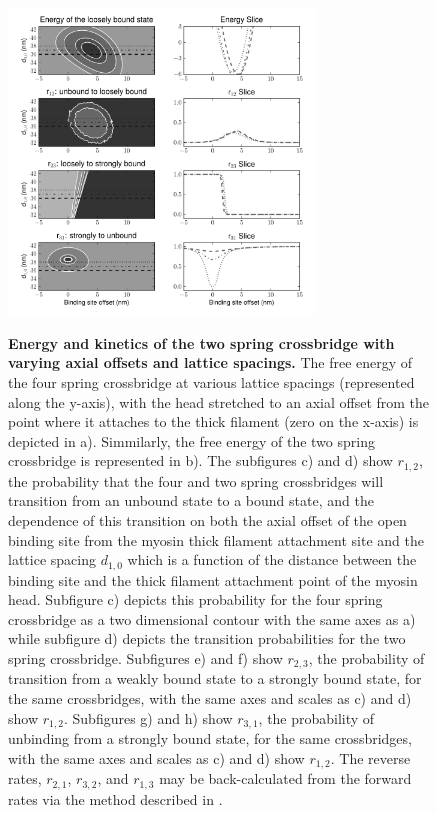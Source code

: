 \documentclass[]{article}
\begin{document}
\begin{figure}[htbp]
    \begin{center}
    \includegraphics[width=3.2in]{../imgs/Figure2.pdf}
    \label{fig:2s}
    \caption{
        \textbf{Energy and kinetics of the two spring crossbridge with varying axial offsets and lattice spacings.} 
        The free energy of the four spring crossbridge at various lattice spacings (represented along the y-axis), with the head stretched to an axial offset from the point where it attaches to the thick filament (zero on the x-axis) is depicted in a). Simmilarly, the free energy of the two spring crossbridge is represented in b).
        The subfigures c) and d) show $r_{1,2}$, the probability that the four and two spring crossbridges will transition from an unbound state to a bound state, and the dependence of this transition on both the axial offset of the open binding site from the myosin thick filament attachment site and the lattice spacing $d_{1,0}$ which is a function of the distance between the binding site and the thick filament attachment point of the myosin head. Subfigure c) depicts this probability for the four spring crossbridge as a two dimensional contour with the same axes as a) while subfigure d) depicts the transition probabilities for the two spring crossbridge.
        Subfigures e) and f) show $r_{2,3}$, the probability of transition from a weakly bound state to a strongly bound state, for the same crossbridges, with the same axes and scales as c) and d) show $r_{1,2}$.
        Subfigures g) and h) show $r_{3,1}$, the probability of unbinding from a strongly bound state, for the same crossbridges, with the same axes and scales as c) and d) show $r_{1,2}$.
        The reverse rates, $r_{2,1}$, $r_{3,2}$, and $r_{1,3}$ may be back-calculated from the forward rates via the method described in \cite{Tanner:2007:pe115}.
    }
    \end{center}
\end{figure}
\end{document}
